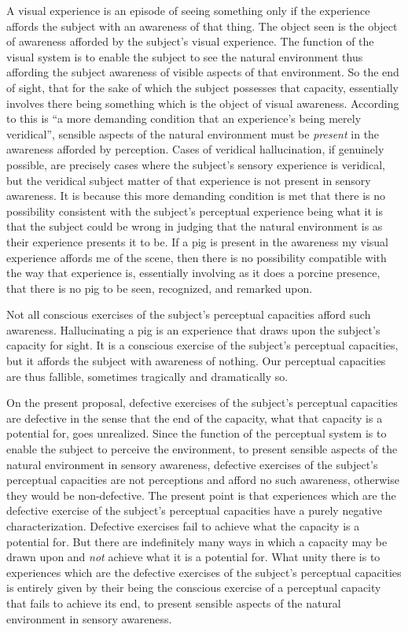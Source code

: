 \documentclass[12pt]{article}
\begin{document}
A visual experience is an episode of seeing something only if the experience affords the subject with an awareness of that thing. The object seen is the object of awareness afforded by the subject's visual experience. The function of the visual system is to enable the subject to see the natural environment thus affording the subject awareness of visible aspects of that environment. So the end of sight, that for the sake of which the subject possesses that capacity, essentially involves there being something which is the object of visual awareness. According to \citet[245]{McDowell:2010fk} this is ``a more demanding condition that an experience's being merely veridical'', sensible aspects of the natural environment must be \emph{present} in the awareness afforded by perception. Cases of veridical hallucination, if genuinely possible, are precisely cases where the subject's sensory experience is veridical, but the veridical subject matter of that experience is not present in sensory awareness. It is because this more demanding condition is met that there is no possibility consistent with the subject's perceptual experience being what it is that the subject could be wrong in judging that the natural environment is as their experience presents it to be. If a pig is present in the awareness my visual experience affords me of the scene, then there is no possibility compatible with the way that experience is, essentially involving as it does a porcine presence, that there is no pig to be seen, recognized, and remarked upon.

Not all conscious exercises of the subject's perceptual capacities afford such awareness. Hallucinating a pig is an experience that draws upon the subject's capacity for sight. It is a conscious exercise of the subject's perceptual capacities, but it affords the subject with awareness of nothing. Our perceptual capacities are thus fallible, sometimes tragically and dramatically so. 

On the present proposal, defective exercises of the subject's perceptual capacities are defective in the sense that the end of the capacity, what that capacity is a potential for, goes unrealized. Since the function of the perceptual system is to enable the subject to perceive the environment, to present sensible aspects of the natural environment in sensory awareness, defective exercises of the subject's perceptual capacities are not perceptions and afford no such awareness, otherwise they would be non-defective. The present point is that experiences which are the defective exercise of the subject's perceptual capacities have a purely negative characterization. Defective exercises fail to achieve what the capacity is a potential for. But there are indefinitely many ways in which a capacity may be drawn upon and \emph{not} achieve what it is a potential for. What unity there is to experiences which are the defective exercises of the subject's perceptual capacities is entirely given by their being the conscious exercise of a perceptual capacity that fails to achieve its end, to present sensible aspects of the natural environment in sensory awareness. 
\end{document}
